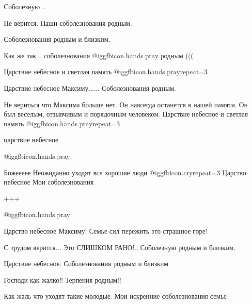 \begin{itemize}
Соболезную ..

Не верится. Наши соболезнования родным.

Соболезнования родным и близким.

Как же так... соболезнования  @igg{fbicon.hands.pray}  родным (((

Царствие небесное и светлая память @igg{fbicon.hands.pray}{repeat=3} 

Царствие небесное Максиму...... Соболезнования родным.


Не вериться что Максима больше нет. Он навсегда останется в нашей памяти. Он
был веселым, отзывчивым и порядочным человеком.  Царствие небесное и светлая
память @igg{fbicon.hands.pray}{repeat=3} 

царствие небесное

 @igg{fbicon.hands.pray} 

Божеееее
Неожиданно уходят все хорошие люди  @igg{fbicon.cry}{repeat=3} 
Царство небесное
Мои соболезнования

+++

 @igg{fbicon.hands.pray} 

Царство небесное Максиму! Семье сил пережить это страшное горе!

С трудом верится... Это СЛИШКОМ РАНО!.. Соболезную родным и близким.

Царствие небесное. Соболезнования родным и близким

Господи как жалко!! Терпения родным!!

Как жаль что уходят такие молодые. Мои искренние соболезнования семье

\end{itemize} %

